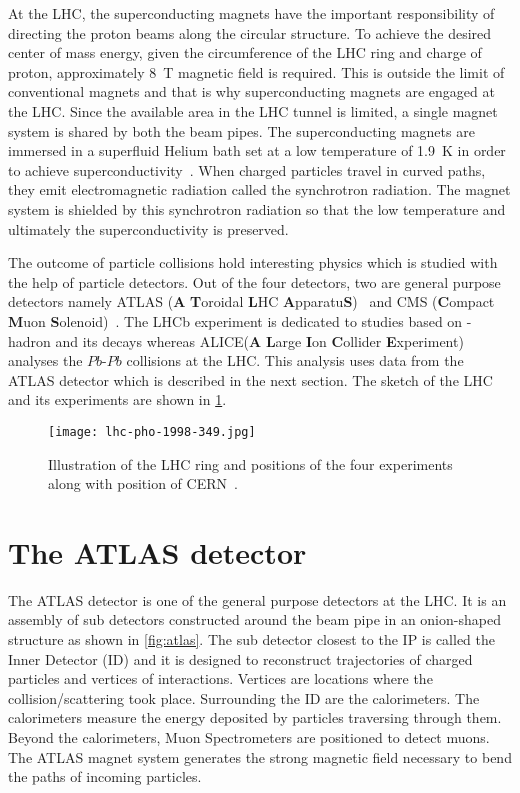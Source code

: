 At the LHC, the superconducting magnets have the important responsibility of directing the proton beams 
along the circular structure. To achieve the desired center of mass energy, 
given the circumference of the LHC ring and charge of proton, approximately \SI{8}{\tesla} magnetic field is 
required. This is outside the limit of conventional magnets and that is why superconducting magnets are 
engaged at the LHC. Since the 
available area in the LHC tunnel is limited, a single magnet system is shared by both the beam pipes. The 
superconducting magnets are immersed in a superfluid Helium bath set at 
a low temperature of \SI{1.9}{\kelvin} in order to achieve superconductivity~\cite{Rossi:630341}. 
When charged particles travel in curved paths, they emit electromagnetic radiation called the 
synchrotron radiation. The magnet system is shielded by this synchrotron radiation so that the low
temperature and ultimately the superconductivity is preserved. 

The outcome of particle collisions hold interesting physics which is studied with the help of particle detectors. 
Out of the four detectors, two are general purpose detectors namely ATLAS (\textbf{A} \textbf{T}oroidal \textbf{L}HC \textbf{A}pparatu\textbf{S})~\cite{TheATLASCollaboration_2008} and
CMS (\textbf{C}ompact \textbf{M}uon \textbf{S}olenoid)~\cite{TheCMSCollaboration_2008}. The LHCb experiment\cite{TheLHCbCollaboration_2008} is dedicated to 
studies based on \PB-hadron and its decays whereas ALICE(\textbf{A} \textbf{L}arge \textbf{I}on \textbf{C}ollider \textbf{E}xperiment)~\cite{TheALICECollaboration_2008}
analyses the $Pb$-$Pb$ collisions at the LHC. This analysis uses data from the ATLAS detector
which is described in the next section. The sketch of 
the LHC and its experiments are shown in \cref{fig:lhc}.


\begin{figure}[htbp]
    \centering
    \texttt{[image: lhc-pho-1998-349.jpg]}
    \caption[LHC and its experiments]{Illustration of the LHC ring and positions of the 
    four experiments along with position of CERN~\cite{Jean-Luc:841555}.}%
    \label{fig:lhc}
\end{figure}

\section{The ATLAS detector}
The ATLAS detector is one of the general purpose detectors at the LHC. It is an assembly of sub detectors constructed around the beam pipe in an onion-shaped structure as shown
in \cref{fig:atlas}. The sub detector closest to the IP is called the Inner Detector (ID) and it
is designed to reconstruct trajectories of charged particles and vertices of interactions. Vertices are
locations where the collision/scattering took place. Surrounding the ID are the calorimeters.
The calorimeters measure the energy deposited by particles traversing through them. Beyond the 
calorimeters, Muon Spectrometers are positioned to detect muons. The ATLAS magnet system generates 
the strong magnetic field necessary to bend the paths of incoming particles.

